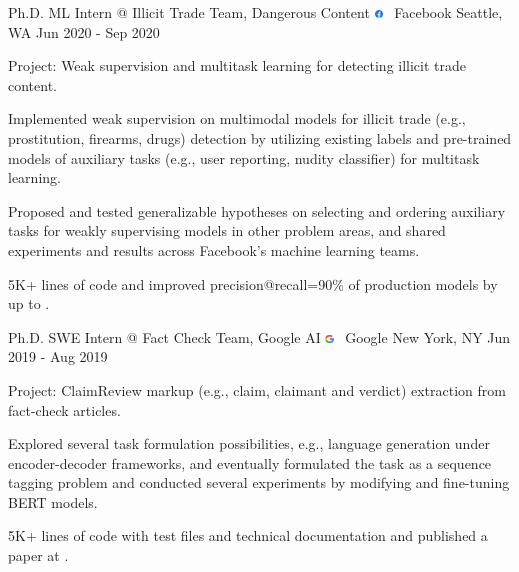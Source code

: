 \documentclass[letterpaper]{awesome-cv}
\begin{document}
\addvspace{0.2ex}
\begin{cventries}
  \cventry
    {Ph.D. ML Intern @ Illicit Trade Team, Dangerous Content}
    {\includegraphics[width=0.016\textwidth]{../images/logos/facebook.png}~ Facebook}
    {Seattle, WA}
    {Jun 2020 - Sep 2020}
    {
      \begin{cvitems}
        \item {Project: Weak supervision and multitask learning for detecting illicit trade content.}
        \item {Implemented weak supervision on multimodal models for illicit trade (e.g., prostitution, firearms, drugs) detection by utilizing existing labels and pre-trained models of auxiliary tasks (e.g., user reporting, nudity classifier) for multitask learning.}
        \item {Proposed and tested generalizable hypotheses on selecting and ordering auxiliary tasks for weakly supervising models in other problem areas, and shared experiments and results across Facebook's machine learning teams.}
        \item { 5K+ lines of code and improved precision@recall=90\% of production models by up to .}
      \end{cvitems}
    }
  \cventry
    {Ph.D. SWE Intern @ Fact Check Team, Google AI}
    {\includegraphics[width=0.016\textwidth]{../images/logos/google.png}~ Google}
    {New York, NY}
    {Jun 2019 - Aug 2019}
    {
      \begin{cvitems}
        \item {Project: ClaimReview markup (e.g., claim, claimant and verdict) extraction from fact-check articles.}
        \item {Explored several task formulation possibilities, e.g., language generation under encoder-decoder frameworks, and eventually formulated the task as a sequence tagging problem and conducted several experiments by modifying and fine-tuning BERT models.}
        \item { 5K+ lines of code with test files and technical documentation and published a paper at .}

\end{cvitems}}
\end{cventries}
\end{document}
